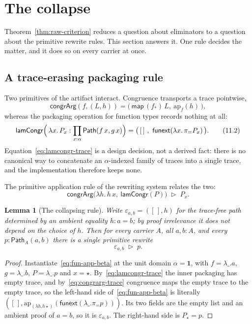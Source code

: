 \documentclass[10pt,reqno]{amsart}
\newtheorem{lemma}[theorem]{Lemma}
\newcommand{\PathTy}{\mathsf{Path}}
\begin{document}
\section{The collapse}
\label{sec:collapse}

Theorem~\ref{thm:raw-criterion} reduces a question about eliminators to a
question about the primitive rewrite rules.  This section answers it.  One rule
decides the matter, and it does so on every carrier at once.

\subsection{A trace-erasing packaging rule}

Two primitives of the artifact interact.  Congruence transports a trace
pointwise,
\[
 \mathsf{congrArg}(f,(L,h))
 =\bigl(\,\mathsf{map}\,(f_*)\,L,\ \mathrm{ap}_f(h)\,\bigr),
\tag{11.1}\label{eq:congrarg-trace}
\]
whereas the packaging operation for function types records nothing at all:
\[
 \mathsf{lamCongr}
   \Bigl(\,\lambda x.\,P_x:\prod_{x:\alpha}\PathTy(f\,x,g\,x)\Bigr)
 =\bigl(\,[\,]\ ,\ \mathsf{funext}(\lambda x.\,\pi_{=}P_x)\,\bigr).
\tag{11.2}\label{eq:lamcongr-trace}
\]
Equation~\eqref{eq:lamcongr-trace} is a design decision, not a derived fact:
there is no canonical way to concatenate an \(\alpha\)-indexed family of traces
into a single trace, and the implementation therefore keeps none.

The primitive application rule of the rewriting system relates the two:
\[
 \mathsf{congrArg}\bigl(\lambda h.\,h\,x,\ \mathsf{lamCongr}(P)\bigr)
 \;\triangleright\;
 P_x .
\tag{11.3}\label{eq:fun-app-beta}
\]

\begin{lemma}[The collapsing rule]
\label{lem:collapse-rule}
Write \(\varepsilon_{a,b}=([\,],h)\) for the trace-free path determined by an
ambient equality \(h:a=b\); by proof irrelevance it does not depend on the
choice of \(h\).  Then for every carrier \(A\), all \(a,b:A\), and \emph{every}
\(p:\PathTy_A(a,b)\) there is a single primitive rewrite
\[
 \varepsilon_{a,b}\;\triangleright\;p .
\tag{11.4}\label{eq:collapse-step}
\]
\end{lemma}

\begin{proof}
Instantiate~\eqref{eq:fun-app-beta} at the unit domain \(\alpha=\mathbf 1\),
with \(f=\lambda\_.a\), \(g=\lambda\_.b\), \(P=\lambda\_.p\) and \(x=\star\).
By~\eqref{eq:lamcongr-trace} the inner packaging has empty trace, and
by~\eqref{eq:congrarg-trace} congruence maps the empty trace to the empty trace,
so the left-hand side of~\eqref{eq:fun-app-beta} is literally
\(([\,],\mathrm{ap}_{(\lambda h.h\star)}(\mathsf{funext}(\lambda\_.\pi_{=}p)))\).
Its two fields are the empty list and an ambient proof of \(a=b\), so it is
\(\varepsilon_{a,b}\).  The right-hand side is \(P_\star=p\).
\end{proof}
\end{document}

